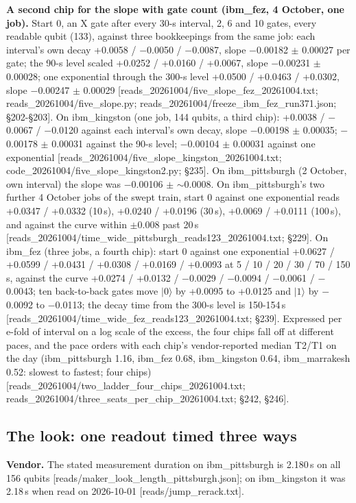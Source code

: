 \documentclass[11pt]{article}
\begin{document}
\textbf{A second chip for the slope with gate count (ibm\_fez, 4 October, one job).} Start 0, an X gate after every 30-\textmu s interval, 2, 6 and 10 gates, every readable qubit (133), against three bookkeepings from the same job: each interval's own decay +0.0058 / \(-\)0.0050 / \(-\)0.0087, slope \(-\)0.00182 \(\pm\) 0.00027 per gate; the 90-\textmu s level scaled +0.0252 / +0.0160 / +0.0067, slope \(-\)0.00231 \(\pm\) 0.00028; one exponential through the 300-\textmu s level +0.0500 / +0.0463 / +0.0302, slope \(-\)0.00247 \(\pm\) 0.00029 {[}reads\_20261004/five\_slope\_fez\_20261004.txt; reads\_20261004/five\_slope.py; reads\_20261004/freeze\_ibm\_fez\_run371.json; \S{}202-\S{}203{]}. On ibm\_kingston (one job, 144 qubits, a third chip): +0.0038 / \(-\)0.0067 / \(-\)0.0120 against each interval's own decay, slope \(-\)0.00198 \(\pm\) 0.00035; \(-\)0.00178 \(\pm\) 0.00031 against the 90-\textmu s level; \(-\)0.00104 \(\pm\) 0.00031 against one exponential {[}reads\_20261004/five\_slope\_kingston\_20261004.txt; code\_20261004/five\_slope\_kingston2.py; \S{}235{]}. On ibm\_pittsburgh (2 October, own interval) the slope was \(-\)0.00106 \(\pm\) \(\sim\)0.0008. On ibm\_pittsburgh's two further 4 October jobs of the swept train, start 0 against one exponential reads +0.0347 / +0.0332 (10\,\textmu s), +0.0240 / +0.0196 (30\,\textmu s), +0.0069 / +0.0111 (100\,\textmu s), and against the curve within \(\pm\)0.008 past 20\,\textmu s {[}reads\_20261004/time\_wide\_pittsburgh\_reads123\_20261004.txt; \S{}229{]}. On ibm\_fez (three jobs, a fourth chip): start 0 against one exponential +0.0627 / +0.0599 / +0.0431 / +0.0308 / +0.0169 / +0.0093 at 5 / 10 / 20 / 30 / 70 / 150\,\textmu s, against the curve +0.0274 / +0.0132 / \(-\)0.0029 / \(-\)0.0094 / \(-\)0.0061 / \(-\)0.0043; ten back-to-back gates move \(|0\rangle\) by +0.0095 to +0.0125 and \(|1\rangle\) by \(-\)0.0092 to \(-\)0.0113; the decay time from the 300-\textmu s level is 150-154\,\textmu s {[}reads\_20261004/time\_wide\_fez\_reads123\_20261004.txt; \S{}239{]}. Expressed per e-fold of interval on a log scale of the excess, the four chips fall off at different paces, and the pace orders with each chip's vendor-reported median T2/T1 on the day (ibm\_pittsburgh 1.16, ibm\_fez 0.68, ibm\_kingston 0.64, ibm\_marrakesh 0.52: slowest to fastest; four chips) {[}reads\_20261004/two\_ladder\_four\_chips\_20261004.txt; reads\_20261004/three\_seats\_per\_chip\_20261004.txt; \S{}242, \S{}246{]}.

\subsection{The look: one readout timed three ways}
\textbf{Vendor.} The stated measurement duration on ibm\_pittsburgh is 2.180\,\textmu s on all 156 qubits {[}reads/maker\_look\_length\_pittsburgh.json{]}; on ibm\_kingston it was 2.18\,\textmu s when read on 2026-10-01 {[}reads/jump\_rerack.txt{]}.
\end{document}
